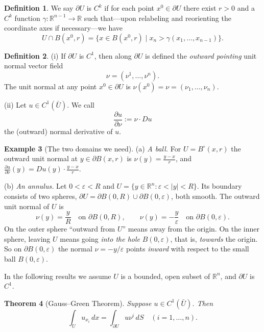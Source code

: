 \documentclass[11pt]{article}
\theoremstyle{plain}
\newtheorem{theorem}{Theorem}[section]
\theoremstyle{definition}
\newtheorem{definition}[theorem]{Definition}
\newtheorem{example}[theorem]{Example}
\theoremstyle{remark}
\begin{document}
\begin{definition}
We say $\partial U$ is $C^k$ if for each point $x^0 \in \partial U$ there exist $r > 0$ and a $C^k$ function $\gamma : \mathbb{R}^{n-1} \to \mathbb{R}$ such that---upon relabeling and reorienting the coordinate axes if necessary---we have
$$ U \cap B(x^0, r) = \{ x \in B(x^0,r) \mid x_n > \gamma(x_1, \dots, x_{n-1}) \}. $$
\end{definition}

\begin{definition}\label{def:normal}
(i) If $\partial U$ is $C^1$, then along $\partial U$ is defined the \textit{outward pointing} unit normal vector field
$$ \nu = (\nu^1, \dots, \nu^n). $$
The unit normal at any point $x^0 \in \partial U$ is $\nu(x^0) = \nu = (\nu_1, \dots, \nu_n)$.

(ii) Let $u \in C^1(\bar U)$. We call
$$ \frac{\partial u}{\partial \nu} := \nu \cdot Du $$
the (outward) normal derivative of $u$.
\end{definition}

\begin{example}[The two domains we need]\label{ex:annulus}
(a) \emph{A ball.} For $U = B^\circ(x,r)$ the outward unit normal at $y \in \partial B(x,r)$ is $\nu(y) = \frac{y - x}{r}$, and $\frac{\partial u}{\partial \nu}(y) = Du(y) \cdot \frac{y-x}{r}$.

(b) \emph{An annulus.} Let $0 < \varepsilon < R$ and $U = \{ y \in \mathbb{R}^n : \varepsilon < |y| < R \}$. Its boundary consists of two spheres, $\partial U = \partial B(0,R) \cup \partial B(0,\varepsilon)$, both smooth. The outward unit normal of $U$ is
$$ \nu(y) = \frac{y}{R} \quad \text{on } \partial B(0,R), \qquad \nu(y) = -\frac{y}{\varepsilon} \quad \text{on } \partial B(0,\varepsilon). $$
On the outer sphere ``outward from $U$'' means away from the origin. On the inner sphere, leaving $U$ means going \emph{into the hole} $B(0,\varepsilon)$, that is, \emph{towards} the origin. So on $\partial B(0,\varepsilon)$ the normal $\nu = -y/\varepsilon$ points \emph{inward} with respect to the small ball $B(0,\varepsilon)$.
\end{example}

In the following results we assume $U$ is a bounded, open subset of $\mathbb{R}^n$, and $\partial U$ is $C^1$.

\begin{theorem}[Gauss--Green Theorem]\label{thm:gaussgreen}
Suppose $u \in C^1(\bar U)$. Then
$$ \int_U u_{x_i}\, dx = \int_{\partial U} u \nu^i\, dS \quad (i = 1, \dots, n). $$
\end{theorem}
\end{document}
